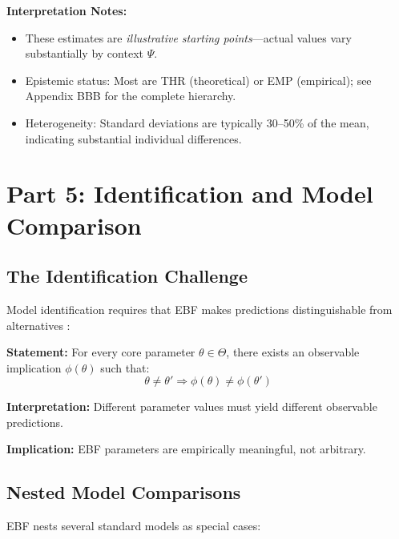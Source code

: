 \textbf{Interpretation Notes:}
\begin{itemize}[nosep]
\item These estimates are \textit{illustrative starting points}---actual values
vary substantially by context $\Psi$.
\item Epistemic status: Most are THR (theoretical) or EMP (empirical); see
Appendix BBB for the complete hierarchy.
\item Heterogeneity: Standard deviations are typically 30--50\% of the mean,
indicating substantial individual differences.
\end{itemize}


\section{Part 5: Identification and Model Comparison}
\label{sec:az-identification}

\subsection{The Identification Challenge}

Model identification requires that EBF makes predictions distinguishable
from alternatives \citep{manski1995identification}:

\begin{tcolorbox}[colback=gray!5!white, colframe=gray!75!black,
    title=Axiom AZ-I1: Falsifiability Requirement]
\textbf{Statement:} For every core parameter $\theta \in \Theta$, there exists
an observable implication $\phi(\theta)$ such that:
\begin{equation}
\theta \neq \theta' \Rightarrow \phi(\theta) \neq \phi(\theta')
\end{equation}

\textbf{Interpretation:} Different parameter values must yield different observable predictions.

\textbf{Implication:} EBF parameters are empirically meaningful, not arbitrary.
\end{tcolorbox}

\subsection{Nested Model Comparisons}

EBF nests several standard models as special cases:

